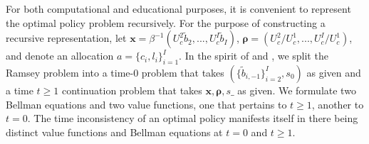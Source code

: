 \documentclass[11.5pt,twoside]{article}
\begin{document}
For both computational and educational purposes, it is convenient to represent the optimal policy problem recursively.  For the purpose of constructing a recursive representation, let $\bm{x}= \beta^{-1}\left( U_{c}^{2}\tilde{b}_{2},...,U_{c}^{I}\tilde{b}_{I}\right)$, $\bm{\rho }=\left( U_{c}^{2}/U_{c}^{1},...,U_{c}^{I}/U_{c}^{1}\right) $, and denote an allocation $a=\{c_i,l_i\}^{I}_{i=1}.$
In the spirit of \cite{Kydland1980} and \cite{Farhi2010}, we split the Ramsey problem into a time-$0$ problem that takes $(\{\tilde{b}_{i,-1}\}^{I}_{i=2}, s_0)$ as given and   a time $t \geq 1$ continuation problem  that takes $\bm x,\bm \rho,s\_$ as given. We formulate
two Bellman equations and two value functions, one that pertains to $t\geq 1$, another to $t=0$.  The time inconsistency of an optimal policy
manifests itself in there being distinct value functions and Bellman equations at $t =0$ and $t \geq 1$.
\end{document}
